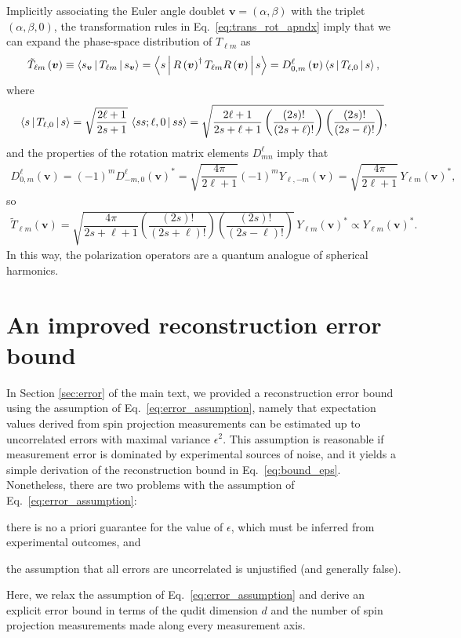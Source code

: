 \documentclass[notitlepage,twocolumn]{revtex4-2}
\newcommand{\f}[2]{\dfrac{#1}{#2}} %
\newcommand{\p}[1]{\left(#1\right)} %
\newcommand{\bk}{\Braket} %
\renewcommand{\v}{\bm} %
\begin{document}
Implicitly associating the Euler angle doublet $\v v = \p{\alpha,\beta}$ with the triplet $\p{\alpha,\beta,0}$, the transformation rules in Eq.~\eqref{eq:trans_rot_apndx} imply that we can expand the phase-space distribution of $T_{\ell m}$ as
\begin{align}
  \tilde T_{\ell m}\p{\v v}
  \equiv \bk{s_{\v v} | T_{\ell m} | s_{\v v}}
  = \bk{s | R\p{\v v}^\dag T_{\ell m} R\p{\v v} | s}
  = D^\ell_{0,m}\p{\v v} \bk{s | T_{\ell,0} | s},
\end{align}
where
\begin{align}
  \bk{s | T_{\ell,0} | s}
  = \sqrt{\f{2\ell+1}{2s+1}} \, \bk{ss;\ell,0|ss}
  = \sqrt{\f{2\ell+1}{2s+\ell+1}
    \p{\f{\p{2s}!}{\p{2s+\ell}!}}
    \p{\f{\p{2s}!}{\p{2s-\ell}!}}},
\end{align}
and the properties of the rotation matrix elements $D^\ell_{mn}$ imply that
\begin{align}
  D^\ell_{0,m}\p{\v v} = \p{-1}^m D^\ell_{-m,0}\p{\v v}^*
  = \sqrt{\f{4\pi}{2\ell+1}} \p{-1}^m Y_{\ell,-m}\p{\v v}
  = \sqrt{\f{4\pi}{2\ell+1}} \, Y_{\ell m}\p{\v v}^*,
\end{align}
so
\begin{align}
  \tilde T_{\ell m}\p{\v v}
  = \sqrt{\f{4\pi}{2s+\ell+1}
    \p{\f{\p{2s}!}{\p{2s+\ell}!}} \p{\f{\p{2s}!}{\p{2s-\ell}!}}} \,
  Y_{\ell m}\p{\v v}^*
  \propto Y_{\ell m}\p{\v v}^*.
\end{align}
In this way, the polarization operators are a quantum analogue of spherical harmonics.

\section{An improved reconstruction error bound}
\label{sec:bound}

In Section \ref{sec:error} of the main text, we provided a reconstruction error bound using the assumption of Eq.~\eqref{eq:error_assumption}, namely that expectation values derived from spin projection measurements can be estimated up to uncorrelated errors with maximal variance $\epsilon^2$.
This assumption is reasonable if measurement error is dominated by experimental sources of noise, and it yields a simple derivation of the reconstruction bound in Eq.~\eqref{eq:bound_eps}.
Nonetheless, there are two problems with the assumption of Eq.~\eqref{eq:error_assumption}:
\begin{enumerate*}
\item there is no a priori guarantee for the value of $\epsilon$, which must be inferred from experimental outcomes, and
\item the assumption that all errors are uncorrelated is unjustified (and generally false).
\end{enumerate*}
Here, we relax the assumption of Eq.~\eqref{eq:error_assumption} and derive an explicit error bound in terms of the qudit dimension $d$ and the number of spin projection measurements made along every measurement axis.
\end{document}
